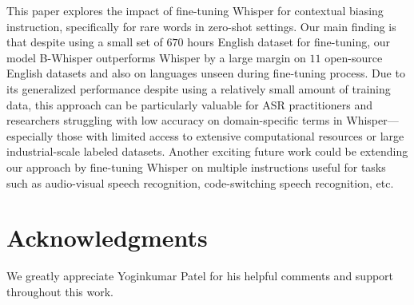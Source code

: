 \documentclass{article}
\begin{document}
This paper explores the impact of fine-tuning Whisper for contextual biasing instruction, specifically for rare words in zero-shot settings. Our main finding is that despite using a small set of $670$ hours English dataset for fine-tuning, our model B-Whisper outperforms Whisper by a large margin on $11$ open-source English datasets and also on languages unseen during fine-tuning process. Due to its generalized performance despite using a relatively small amount of training data, this approach can be particularly valuable for ASR practitioners and researchers struggling with low accuracy on domain-specific terms in Whisper—especially those with limited access to extensive computational resources or large industrial-scale labeled datasets. Another exciting future work could be extending our approach by fine-tuning Whisper on multiple instructions useful for tasks such as audio-visual speech recognition, code-switching speech recognition, etc.

\section{Acknowledgments}

We greatly appreciate Yoginkumar Patel for his helpful comments and support throughout this work.

\label{sec:print}



\end{document}
